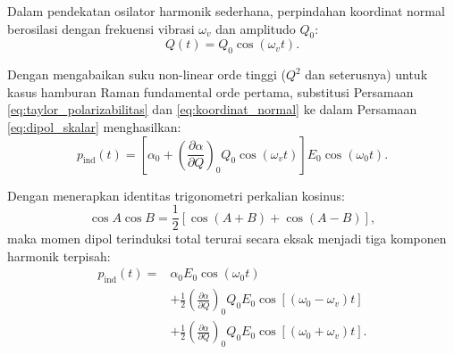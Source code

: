 Dalam pendekatan osilator harmonik sederhana, perpindahan koordinat normal berosilasi dengan frekuensi vibrasi $\omega_v$ dan amplitudo $Q_0$:
\begin{equation}
Q(t) = Q_0 \cos(\omega_v t).
\label{eq:koordinat_normal}
\end{equation}

Dengan mengabaikan suku non-linear orde tinggi ($Q^2$ dan seterusnya) untuk kasus hamburan Raman fundamental orde pertama, substitusi Persamaan \eqref{eq:taylor_polarizabilitas} dan \eqref{eq:koordinat_normal} ke dalam Persamaan \eqref{eq:dipol_skalar} menghasilkan:
\begin{equation}
p_{\mathrm{ind}}(t) = \left[ \alpha_0 + \left(\frac{\partial \alpha}{\partial Q}\right)_0 Q_0 \cos(\omega_v t) \right] E_0 \cos(\omega_0 t).
\label{eq:substitusi_dipol}
\end{equation}

Dengan menerapkan identitas trigonometri perkalian kosinus:
\begin{equation}
\cos A \cos B = \frac{1}{2} \left[ \cos(A + B) + \cos(A - B) \right],
\end{equation}
maka momen dipol terinduksi total terurai secara eksak menjadi tiga komponen harmonik terpisah:
\begin{equation}
\begin{aligned}
p_{\mathrm{ind}}(t) ={}& \alpha_0 E_0 \cos(\omega_0 t) \\
& + \frac{1}{2} \left(\frac{\partial \alpha}{\partial Q}\right)_0 Q_0 E_0 \cos[(\omega_0 - \omega_v)t] \\
& + \frac{1}{2} \left(\frac{\partial \alpha}{\partial Q}\right)_0 Q_0 E_0 \cos[(\omega_0 + \omega_v)t].
\end{aligned}
\label{eq:komponen_raman}
\end{equation}


